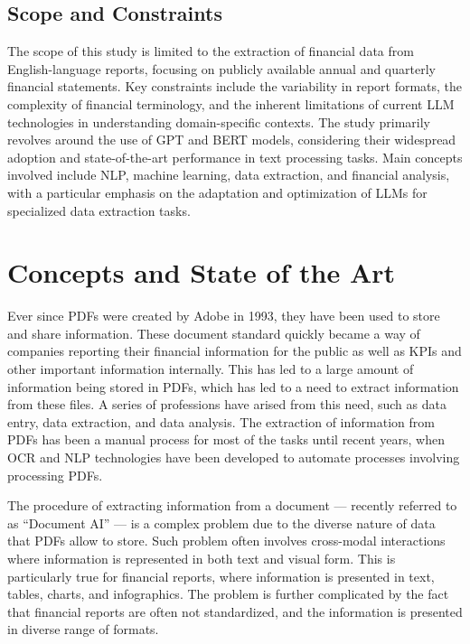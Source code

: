 \documentclass[english, 12pt, a4paper, elec, utf8, a-2b, online]{aaltothesis}
\begin{document}
\subsection{Scope and Constraints}

The scope of this study is limited to the extraction of financial data from English-language reports, focusing on publicly available annual and quarterly financial statements. Key constraints include the variability in report formats, the complexity of financial terminology, and the inherent limitations of current LLM technologies in understanding domain-specific contexts. The study primarily revolves around the use of GPT and BERT models, considering their widespread adoption and state-of-the-art performance in text processing tasks. Main concepts involved include \ac{NLP}, machine learning, data extraction, and financial analysis, with a particular emphasis on the adaptation and optimization of LLMs for specialized data extraction tasks.

\clearpage

\section{Concepts and State of the Art}

Ever since \ac{PDF}s were created by Adobe in 1993, they have been used to store and share information. These document standard quickly became a way of companies reporting their financial information for the public as well as \ac{KPI}s and other important information internally. This has led to a large amount of information being stored in \ac{PDF}s, which has led to a need to extract information from these files. A series of professions have arised from this need, such as data entry, data extraction, and data analysis. The extraction of information from \ac{PDF}s has been a manual process for most of the tasks until recent years, when \ac{OCR} and \ac{NLP} technologies have been developed to automate processes involving processing \ac{PDF}s.

The procedure of extracting information from a document --- recently referred to as ``Document AI'' \cite{Cui2021} --- is a complex problem due to the diverse nature of data that \ac{PDF}s allow to store. Such problem often involves cross-modal interactions where information is represented in both text and visual form.
This is particularly true for financial reports, where information is presented in text, tables, charts, and infographics.
The problem is further complicated by the fact that financial reports are often not standardized, and the information is presented in diverse range of formats.
%
\end{document}
